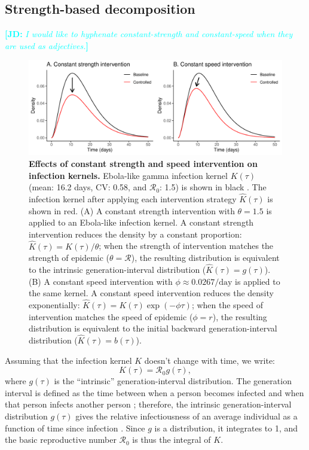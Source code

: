 \documentclass[12pt]{article}
\newcommand{\comment}[3]{\textcolor{#1}{\textbf{[#2: }\textit{#3}\textbf{]}}}
\newcommand{\jd}[1]{\comment{cyan}{JD}{#1}}
\newcommand{\RR}{\ensuremath{{\mathcal R}}}
\newcommand{\figlab}[1]{\label{fig:#1}}
\newcommand{\eqlab}[1]{\label{eq:#1}}
\begin{document}
\subsection{Strength-based decomposition}

\jd{I would like to hyphenate constant-strength and constant-speed when they are used as adjectives.}

\begin{figure}[!t]
\includegraphics[width=\textwidth]{../figure/constant_intervention.pdf}
\caption{
\textbf{Effects of constant strength and speed intervention on infection kernels.}
Ebola-like gamma infection kernel $K(\tau)$ (mean: 16.2 days, CV: 0.58, and $\RR_0$: 1.5) is shown in black \citep{park2019practical}.
The infection kernel after applying each intervention strategy $\hat K(\tau)$ is shown in red.
(A) A constant strength intervention with $\theta = 1.5$ is applied to an Ebola-like infection kernel.
A constant strength intervention reduces the density by a constant proportion: $\hat K(\tau) = K(\tau)/\theta$; when the strength of intervention matches the strength of epidemic ($\theta = \mathcal R$), the resulting distribution is equivalent to the intrinsic generation-interval distribution ($\hat K(\tau) = g(\tau)$).
(B) A constant speed intervention with $\phi \approx 0.0267/\mathrm{day}$ is applied to the same kernel.
A constant speed intervention reduces the density exponentially: $\hat K(\tau) = K(\tau) \exp(-\phi \tau)$; when the speed of intervention matches the speed of epidemic ($\phi = r$), the resulting distribution is equivalent to the initial backward generation-interval distribution ($\hat K(\tau) = b(\tau)$). 
}
\figlab{constant}
\end{figure}

Assuming that the infection kernel $K$ doesn't change with time, we write:
\begin{equation}
	K(\tau) = \RR_0 g(\tau),
	\eqlab{strength}
\end{equation}
where $g(\tau)$ is the ``intrinsic'' generation-interval distribution.
The generation interval is defined as the time between when a person becomes infected and when that person infects another person \citep{svensson2007note};
therefore, the intrinsic generation-interval distribution $g(\tau)$ gives the relative infectiousness of an average individual as a function of time since infection \citep{champredon2015intrinsic}. 
Since $g$ is a distribution, it integrates to 1, and the basic reproductive number $\RR_0$ is thus the integral of $K$.
\end{document}
